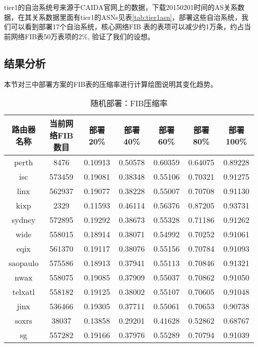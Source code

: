 tier1的自治系统号来源于CAIDA官网上的数据，下载20150201时间的AS关系数据，在其关系数据里面有tier1的ASNs见表\ref{tab:tier1asn}，部署这些自治系统，我们可以看到部署17个自治系统，核心网络FIB 表的表项可以减少约1万条，约占当前网络FIB表50万表项的2\%, 验证了我们的设想。

\subsection{结果分析}
本节对三中部署方案的FIB表的压缩率进行计算绘图说明其变化趋势。

\begin{table}[h]
    \centering
    \caption{随机部署：FIB压缩率}
    \label{tab:origindatarate}
        \begin{tabular}{|c|c|c|c|c|c|c|}
            \hline
            路由器名称 & 当前网络FIB数目 & 部署20\% &部署40\% &部署60\% &部署80\% &部署100\% \\ \hline
            perth    & 8476   & 0.10913   & 0.50578  & 0.60359   & 0.64075   & 0.89228     \\ \hline
            isc      & 573459 & 0.19081 & 0.38348 & 0.55106 & 0.70321 & 0.91275    \\ \hline
            linx     & 562937 & 0.19077 & 0.38228 & 0.55007 & 0.70708 & 0.91130     \\ \hline
            kixp     & 2329   & 0.11593   & 0.46114   & 0.56376   & 0.87205    & 0.93731        \\ \hline
            sydney   & 572895 & 0.19292 & 0.38673 & 0.55328 & 0.71186 & 0.91262       \\ \hline
            wide     & 558015 & 0.18914 & 0.38071 & 0.54992 & 0.70252 & 0.91061        \\ \hline
            eqix     & 561370 & 0.19117 & 0.38076& 0.55156 & 0.70784 & 0.91093         \\ \hline
            saopaulo & 575586 & 0.18913 & 0.37941 & 0.55113 & 0.70846 & 0.91321          \\ \hline
            nwax     & 558075 & 0.19085 & 0.37909 & 0.55037 & 0.70862 & 0.91050           \\ \hline
            telxatl  & 558182 & 0.19125 & 0.38002 & 0.55107 & 0.70605 & 0.91048            \\ \hline
            jinx     & 536466 & 0.19305 & 0.37711 & 0.55061 & 0.70653 & 0.90738             \\ \hline
            soxrs    & 38037  & 0.13858  & 0.29201  & 0.41628  & 0.52862  & 0.68767            \\ \hline
            sg       & 557282 & 0.19166 & 0.37976 & 0.55289 & 0.70794 & 0.91039              \\ \hline
        \end{tabular}
\end{table}

